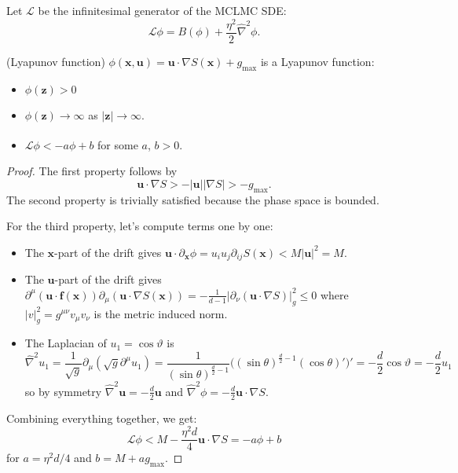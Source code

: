 \documentclass[tablecaption=bottom,wcp]{jmlr} %
\newcommand{\x}{\boldsymbol{x}}
\newcommand{\U}{\boldsymbol{u}}
\newcommand{\Z}{\boldsymbol{z}}
\begin{document}
Let $\mathcal{L}$ be the infinitesimal generator of the MCLMC SDE:
\begin{equation}
    \mathcal{L} \phi = B (\phi) + \frac{\eta^2}{2} \widehat{\nabla}^2 \phi .
\end{equation}


\begin{lemma} (Lyapunov function) \label{Lyapunov}
$\phi(\x, \U) = \U \cdot \nabla S(\x) + g_{\mathrm{max}}$ is a Lyapunov function:
    \begin{itemize}
        \item $\phi(\Z) > 0$ 
        \item $\phi(\Z) \xrightarrow[]{} \infty$ as $\vert \Z \vert \xrightarrow[]{} \infty$.
        \item $\mathcal{L} \phi < - a \phi + b$ for some $a$, $b > 0$.
    \end{itemize}   
\end{lemma}


\begin{proof}
    The first property follows by 
    \begin{equation*}
        \U \cdot \nabla S > - \vert \U \vert \vert \nabla S \vert > -g_{\mathrm{max}}.
    \end{equation*}
    The second property is trivially satisfied because the phase space is bounded. 
    
    For the third property, let's compute terms one by one:
    \begin{itemize}
        \item The $\x$-part of the drift gives $\U \cdot \partial_{\x} \phi = u_i u_j \partial_{i j} S(\x) < M \vert \U \vert^2 = M$.
            
        \item The $\U$-part of the drift gives
            $\partial^{\mu}( \U \cdot \boldsymbol{f}(\x) ) \partial_{\mu}( \U \cdot \nabla S(\x))  =  - \frac{1}{d-1}  \vert \partial_{\nu} (\U \cdot \nabla S) \vert^2_g \leq 0$
            where $\vert v \vert_g^2 = g^{\mu \nu} v_{\mu} v_{\nu}$ is the metric induced norm.

        \item The Laplacian of $u_1 = \cos \vartheta$ is
            \[ 
            \widehat{\nabla}^2 u_{1} = \frac{1}{\sqrt{g}} \partial_{\mu} (\sqrt{g} \partial^{\mu} u_1)  = \frac{1}{(\sin \theta)^{\frac{d}{2} - 1}} \big(  (\sin \theta)^{\frac{d}{2} - 1} (\cos \theta)' \big) ' = - \frac{d}{2} \cos \vartheta = - \frac{d}{2} u_1
            \]
            so by symmetry $\widehat{\nabla}^2 \U = - \frac{d}{2} \U$ and $\widehat{\nabla}^2 \phi = - \frac{d}{2} \U \cdot \nabla S$.
    \end{itemize}
    
    Combining everything together, we get:
    \begin{equation*}
        \mathcal{L} \phi < M - \frac{\eta^2 d}{4} \U \cdot \nabla S = - a \phi + b
    \end{equation*}
    for $a = \eta^2 d / 4$ and $b = M + a g_{\mathrm{max}}$. 
\end{proof}
\end{document}
